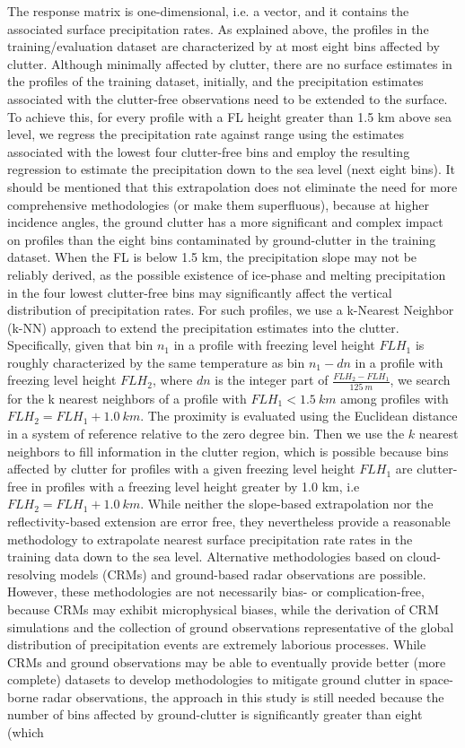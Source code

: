 \documentclass{ametsocV6.1} %
\begin{document}
The response matrix is one-dimensional, i.e. a vector, and it contains the associated surface precipitation rates. As explained above, the profiles in the training/evaluation dataset are characterized by at most eight bins affected by clutter. Although minimally affected by clutter, there are no surface estimates in the profiles of the training dataset, initially, and the precipitation estimates associated with the clutter-free observations need to be extended to the surface. To achieve this, for every profile with a FL height greater than 1.5 km above sea level, we regress the precipitation rate against range using the estimates associated with the lowest four clutter-free bins  and employ the resulting regression to estimate the precipitation down to the sea level (next eight bins). It should be mentioned that this extrapolation does not eliminate the need for more comprehensive methodologies (or make them superfluous), because at higher incidence angles, the ground clutter has a more significant and complex impact on profiles than the eight bins contaminated by ground-clutter in the training dataset.  When the FL is below 1.5 km, the precipitation slope may not be reliably derived, as the possible existence of ice-phase and melting precipitation in the four lowest clutter-free bins  may significantly affect the vertical distribution of precipitation rates. For such profiles, we use a k-Nearest Neighbor (k-NN) \citep{friedman2001} approach to extend the precipitation estimates into the clutter.  Specifically, given that bin $n_1$ in a profile with freezing level height $FLH_1$ is roughly characterized by the same temperature as bin $n_1-dn$ in a profile with freezing level height $FLH_2$, where $dn$ is the integer part of $\frac {FLH_2-FLH_1}{125\medspace m}$, we search for the k nearest neighbors of a profile with $FLH_1<1.5\medspace km$ among profiles with $FLH_2=FLH_1+1.0\medspace km$. The proximity is evaluated using the Euclidean distance in a system of reference relative to the zero degree bin. Then we use the $k$ nearest neighbors to fill information in the clutter region, which is possible because bins affected by clutter for profiles with a given freezing level height $FLH_1$ are clutter-free in profiles with a freezing level height greater by 1.0 km, i.e $FLH_2=FLH_1+1.0\medspace km$. While neither the slope-based extrapolation nor the reflectivity-based extension are error free, they nevertheless provide a reasonable methodology to extrapolate nearest surface precipitation rate rates in the training data down to the sea level. Alternative methodologies based on cloud-resolving models (CRMs) and ground-based radar observations are possible. However, these methodologies are not necessarily bias- or complication-free, because CRMs may exhibit microphysical biases, while the derivation of CRM simulations and the collection of ground observations representative of the global distribution of precipitation events are extremely laborious processes. While CRMs and ground observations may be able to eventually provide better (more complete) datasets to develop methodologies to mitigate ground clutter in space-borne radar observations, the approach in this study is still needed because the number of bins affected by ground-clutter is significantly greater than eight (which 
\end{document}
